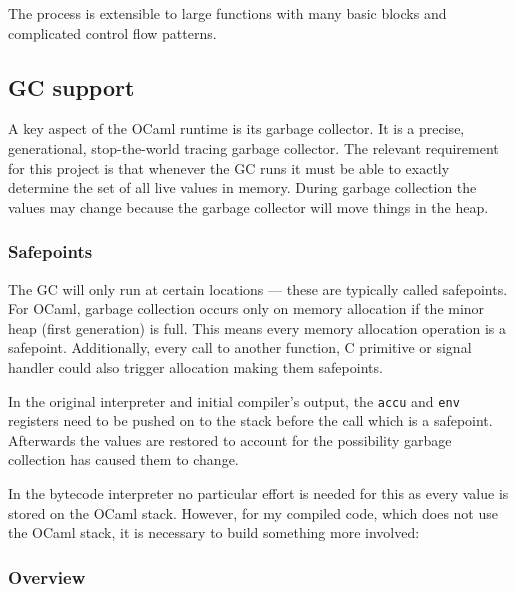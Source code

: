The process is extensible to large functions with many basic blocks and complicated control flow
patterns.

\subsection{GC support} \label{gc-support}

A key aspect of the OCaml runtime is its garbage collector. It is a precise, generational,
stop-the-world tracing garbage collector. The relevant requirement for this project is that
whenever
the GC runs it must be able to exactly determine the set of all live values in memory. During
garbage collection the values may change because the garbage collector will move things in the
heap.

\subsubsection{Safepoints}

The GC will only run at certain locations --- these are typically called safepoints. For OCaml,
garbage collection occurs only on memory allocation if the minor heap (first generation) is full.
This means every memory allocation operation is a safepoint. Additionally, every call to another
function, C primitive or signal handler could also trigger allocation making them safepoints.

In the original interpreter and initial compiler's output, the \texttt{accu} and \texttt{env}
registers
need to be pushed on to the stack before the call which is a safepoint. Afterwards the values are
restored to account for the possibility garbage collection has caused them to change.

In the bytecode interpreter no particular effort is needed for this as every value is stored on the
OCaml stack. However, for my compiled code, which does not use the OCaml stack, it is necessary to
build something more involved:

\subsubsection{Overview}

